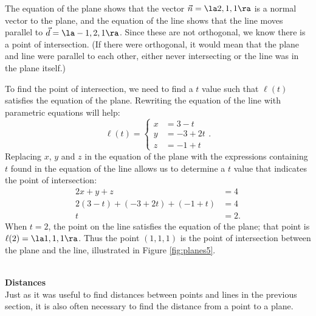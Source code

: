 {The equation of the plane shows that the vector $\vec n = \la 2,1,1\ra$ is a normal vector to the plane, and the equation of the line shows that the line moves parallel to $\vec d = \la -1,2,1\ra$. Since these are not orthogonal, we know there is a point of intersection. (If there were orthogonal, it would mean that the plane and line were parallel to each other, either never intersecting or the line was in the plane itself.)

To find the point of intersection, we need to find a $t$ value such that $\ell(t)$ satisfies the equation of the plane. Rewriting the equation of the line with parametric equations will help:
$$\ell(t) = \left\{\begin{aligned} x&= 3-t\\ y&=-3+2t\\ z&= -1+t \end{aligned}\right..$$
Replacing $x$, $y$ and $z$ in the equation of the plane with the expressions containing $t$ found in the equation of the line allows us to determine a $t$ value that indicates the point of intersection:
\begin{align*}
2x+y+z &=4 \\
2(3-t) + (-3+2t) + (-1+t) &= 4 \\
t&=2.
\end{align*}
When $t=2$, the point on the line satisfies the equation of the plane; that point is $\ell(2) = \la 1,1,1\ra$. Thus the point $(1,1,1)$ is the point of intersection between the plane and the line, illustrated in Figure \ref{fig:planes5}.
}\\

\noindent\textbf{\large Distances}\\

Just as it was useful to find distances between points and lines in the previous section, it is also often necessary to find the distance from a point to a plane. 

